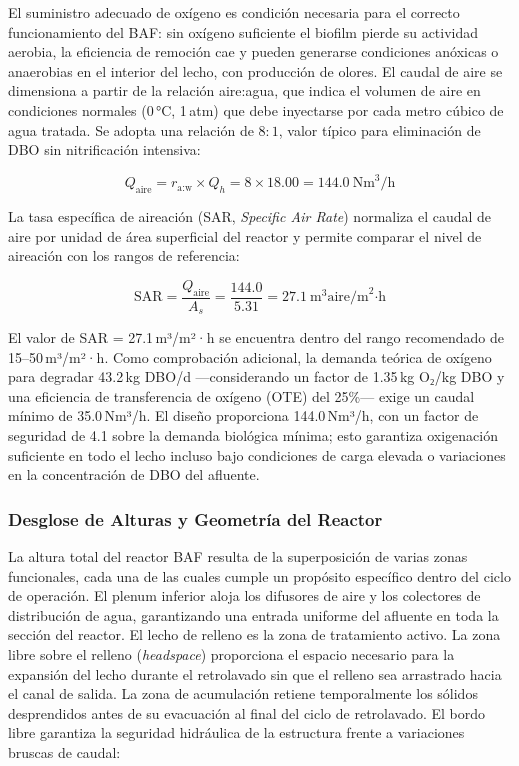 \documentclass[12pt,a4paper]{article}
\newcommand{\captionequation}[1]{\vspace{-0.5em}\caption*{#1}\vspace{0.5em}}
\begin{document}
El suministro adecuado de oxígeno es condición necesaria para el correcto funcionamiento del BAF: sin oxígeno suficiente el biofilm pierde su actividad aerobia, la eficiencia de remoción cae y pueden generarse condiciones anóxicas o anaerobias en el interior del lecho, con producción de olores. El caudal de aire se dimensiona a partir de la relación aire:agua, que indica el volumen de aire en condiciones normales (0\,°C, 1\,atm) que debe inyectarse por cada metro cúbico de agua tratada. Se adopta una relación de $8:1$, valor típico para eliminación de DBO sin nitrificación intensiva:

\begin{equation}
Q_{\text{aire}} = r_{\text{a:w}} \times Q_{h} = 8 \times 18.00 = 144.0\ \text{Nm}^3\text{/h}
\end{equation}
\captionequation{Caudal de aire suministrado al proceso biológico}

La tasa específica de aireación (SAR, \textit{Specific Air Rate}) normaliza el caudal de aire por unidad de área superficial del reactor y permite comparar el nivel de aireación con los rangos de referencia:

\begin{equation}
\text{SAR} = \frac{Q_{\text{aire}}}{A_{s}} = \frac{144.0}{5.31} = 27.1\ \text{m}^3\text{aire/m}^2\text{·h}
\end{equation}
\captionequation{Tasa específica de aireación}

El valor de SAR = 27.1\,m³/m²·h se encuentra dentro del rango recomendado de 15--50\,m³/m²·h. Como comprobación adicional, la demanda teórica de oxígeno para degradar 43.2\,kg DBO/d —considerando un factor de 1.35\,kg O₂/kg DBO y una eficiencia de transferencia de oxígeno (OTE) del 25\%— exige un caudal mínimo de 35.0\,Nm³/h. El diseño proporciona 144.0\,Nm³/h, con un factor de seguridad de 4.1 sobre la demanda biológica mínima; esto garantiza oxigenación suficiente en todo el lecho incluso bajo condiciones de carga elevada o variaciones en la concentración de DBO del afluente.

\subsubsection*{Desglose de Alturas y Geometría del Reactor}

La altura total del reactor BAF resulta de la superposición de varias zonas funcionales, cada una de las cuales cumple un propósito específico dentro del ciclo de operación. El plenum inferior aloja los difusores de aire y los colectores de distribución de agua, garantizando una entrada uniforme del afluente en toda la sección del reactor. El lecho de relleno es la zona de tratamiento activo. La zona libre sobre el relleno (\textit{headspace}) proporciona el espacio necesario para la expansión del lecho durante el retrolavado sin que el relleno sea arrastrado hacia el canal de salida. La zona de acumulación retiene temporalmente los sólidos desprendidos antes de su evacuación al final del ciclo de retrolavado. El bordo libre garantiza la seguridad hidráulica de la estructura frente a variaciones bruscas de caudal:
\end{document}
